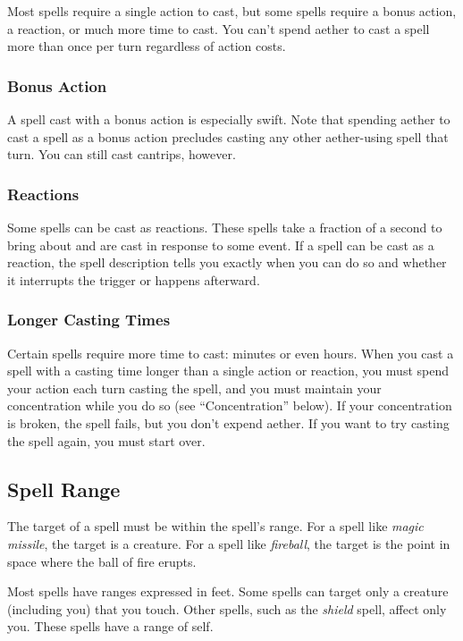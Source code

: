 Most spells require a single action to cast, but some spells require a bonus action, a reaction, or much more time to cast. You can't spend aether to cast a spell more than once per turn regardless of action costs.

\subsubsection{Bonus Action}

A spell cast with a bonus action is especially swift. Note that spending aether to cast a spell as a bonus action precludes casting any other aether-using spell that turn. You can still cast cantrips, however.

\subsubsection{Reactions}

Some spells can be cast as reactions. These spells take a fraction of a second to bring about and are cast in response to some event. If a spell can be cast as a reaction, the spell description tells you exactly when you can do so and whether it interrupts the trigger or happens afterward.

\subsubsection{Longer Casting Times}

Certain spells require more time to cast: minutes or even hours. When you cast a spell with a casting time longer than a single action or reaction, you must spend your action each turn casting the spell, and you must maintain your concentration while you do so (see “Concentration” below). If your concentration is broken, the spell fails, but you don't expend aether. If you want to try casting the spell again, you must start over.

\subsection{Spell Range}

The target of a spell must be within the spell's range. For a spell like \textit{magic missile}, the target is a creature. For a spell like \textit{fireball}, the target is the point in space where the ball of fire erupts.

Most spells have ranges expressed in feet. Some spells can target only a creature (including you) that you touch. Other spells, such as the \textit{shield} spell, affect only you. These spells have a range of self.

